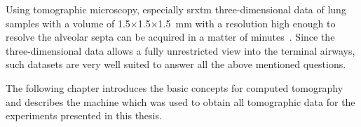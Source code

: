 Using tomographic microscopy, especially \ac{srxtm} three-dimensional data of lung samples with a volume of 1.5$\times$1.5$\times$\SI{1.5}{\milli\meter} with a resolution high enough to resolve the alveolar septa can be acquired in a matter of minutes~\cite{Hintermueller2010}. Since the three-dimensional data allows a fully unrestricted view into the terminal airways, such datasets are very well suited to answer all the above mentioned questions.

The following chapter introduces the basic concepts for computed tomography and describes the machine which was used to obtain all tomographic data for the experiments presented in this thesis.